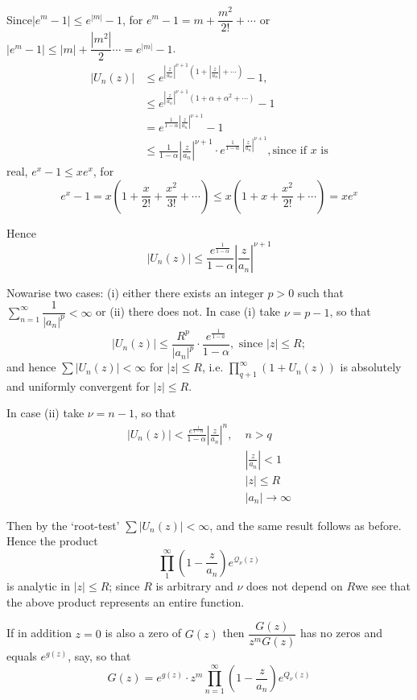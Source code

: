Since\pageoriginale $|e^m -1| \leq e^{|m|} -1$, for $e^m -1 = m +
\dfrac{m^2}{2!}+\cdots$ or
$|e^m-1| \leq |m| + \dfrac{|m^2|}{2} \cdots = e^{|m|}-1$.
\begin{align*}
|U_n(z)| & \leq e^{\left|\frac{z}{a_n} \right|^{\nu+1}
  \left(1+\left|\frac{z}{a_n} \right| + \cdots \right)}  -1,\\
 & \leq e^{\left|\frac{z}{a_n} \right|^{\nu+1} (1+\alpha+\alpha^2 +
  \cdots)}  -1\\ 
& = e^{\frac{1}{1-\alpha} \left|\frac{z}{a_n} \right|^{\nu+1}}-1\\
& \leq \frac{1}{1-\alpha} \left|\frac{z}{a_n} \right|^{\nu+1}  \cdot
e^{\frac{1}{1-\alpha} \;  \left|\frac{z}{a_n} \right|^{\nu+1}}, \text{
  since if $x$ is} 
\end{align*}
real, $e^x -1 \leq x e^x$, for 
$$
e^x -1 = x \left(1+\dfrac{x}{2!} +
\dfrac{x^2}{3!}+\cdots \right) \leq x \left(1+x + \dfrac{x^2}{2!} +\cdots\right)
= x e^x
$$ 

Hence
$$
|U_n (z)| \leq \frac{e^{\frac{1}{1 - \alpha}}}{1-\alpha} \left|
\frac{z}{a_n}\right|^{\nu+1} 
$$

Now\pageoriginale arise two cases: (i) either there
exists an integer $p>0$ such that $\sum\limits^\infty_{n=1}
\dfrac{1}{|a_n|^p} < \infty$ or (ii) there does not. In case (i) take
$\nu = p -1$, so that 
$$ 
|U_n (z)| \leq \frac{R^p}{|a_n|^p} \cdot \frac{e^{\frac{1}{1-a}}}{1-\alpha},
\text{ since } |z| \leq R; 
$$
and hence $\sum |U_n(z)|< \infty$ for $|z| \leq R$,
i.e. $\prod\limits^{\infty}_{q+1}(1+U_n(z))$ is absolutely and
uniformly convergent for $|z| \leq R$.

In case (ii) take $\nu = n - 1$, so that
\begin{align*} 
|U_n(z)| < \frac{e^{\frac{1}{1 - \alpha}}}{1-\alpha} \left|\frac{z}{a_n}
\right|^n, \;  & n > q\\
& \left|\frac{z}{a_n} \right| < 1\\
& |z| \leq R\\
& |a_n| \to \infty
\end{align*}

Then by the `root-test' $\sum |U_n (z)| < \infty$, and the same result
follows as before. Hence the product
$$
\prod\limits^\infty_1 \left(1-\frac{z}{a_n} \right) e^{\mathcal{Q}_\nu(z)}
$$
is analytic in $|z| \leq R$; since $R$ is arbitrary and $\nu$ does not
depend on $R$\pageoriginale we see that the above product represents
an entire function.

\begin{remark*}
If in addition $z = 0$ is also a zero of $G(z)$ then
$\dfrac{G(z)}{z^mG(z)}$ has no zeros and equals $e^{g(z)}$, say, so
that 
$$
G(z) = e^{g(z)} \cdot z^m \prod\limits^\infty_{n=1} 
\left(1-\frac{z}{a_n} \right) e^{Q_\nu (z)}
 $$
\end{remark*}

